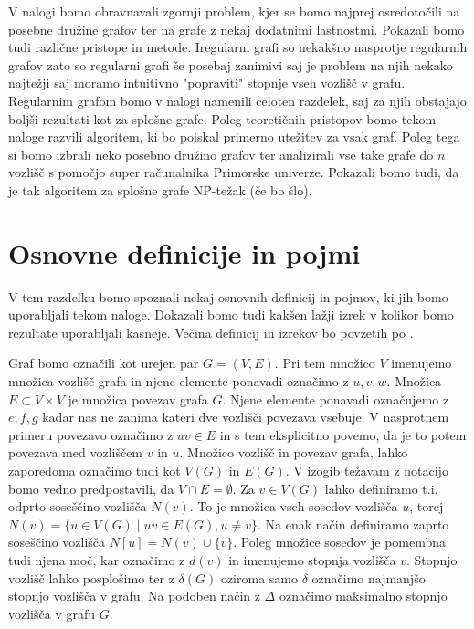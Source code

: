 \documentclass[12pt,a4paper,twoside]{article}
\theoremstyle{definition} %
\theoremstyle{plain} %
\numberwithin{equation}{section}  %
\begin{document}
V nalogi bomo obravnavali zgornji problem, kjer se bomo najprej osredotočili na posebne družine grafov ter na grafe z nekaj dodatnimi lastnostmi. Pokazali bomo tudi različne pristope in metode. Iregularni grafi so nekakšno nasprotje regularnih grafov zato so regularni grafi še posebaj zanimivi saj je problem na njih nekako najtežji saj moramo intuitivno "popraviti" stopnje vseh vozlišč v grafu. Regularnim grafom bomo v nalogi namenili celoten razdelek, saj za njih obstajajo boljši rezultati kot za splošne grafe. Poleg teoretičnih pristopov bomo tekom naloge razvili algoritem, ki bo poiskal primerno utežitev za vsak graf. Poleg tega si bomo izbrali neko posebno družino grafov ter analizirali vse take grafe do $n$ vozlišč s pomočjo super računalnika Primorske univerze. Pokazali bomo tudi, da je tak algoritem za splošne grafe NP-težak (če bo šlo).



\section{Osnovne definicije in pojmi}

V tem razdelku bomo spoznali nekaj osnovnih definicij in pojmov, ki jih bomo uporabljali tekom naloge. Dokazali bomo tudi kakšen lažji izrek v kolikor bomo rezultate uporabljali kasneje. Večina definicij in izrekov bo povzetih po \cite{maingraph}.

Graf bomo označili kot urejen par $G=(V, E)$. Pri tem množico $V$ imenujemo množica vozlišč grafa in njene elemente ponavadi označimo z $u, v, w$. Množica $E \subset V \times V$ je množica povezav grafa $G$. Njene elemente ponavadi označujemo z $e, f, g$ kadar nas ne zanima kateri dve vozlišči povezava vsebuje. V nasprotnem primeru povezavo označimo z $uv \in E$ in s tem eksplicitno povemo, da je to potem povezava med vozliščem $v$ in $u$. Množico vozlišč in povezav grafa, lahko zaporedoma označimo tudi kot $V(G)$ in $E(G)$. V izogib težavam z notacijo bomo vedno predpostavili, da $V \cap E = \emptyset$. 
Za $v \in V(G)$ lahko definiramo t.i. odprto soseščino vozlišča $N(v)$. To je množica vseh sosedov vozlišča $u$, torej $N(v) = \{u \in V(G) \mid uv \in E(G), u \neq v \}$. Na enak način definiramo zaprto soseščino vozlišča $N\left[u\right] = N(v) \cup \{v\}$. Poleg množice sosedov je pomembna tudi njena moč, kar označimo z $d(v)$ in imenujemo stopnja vozlišča $v$. Stopnjo vozlišč lahko posplošimo ter  z $\delta(G)$ oziroma samo $\delta$ označimo najmanjšo stopnjo vozlišča v grafu. Na podoben način z $\Delta$ označimo maksimalno stopnjo vozlišča v grafu $G$. 
\end{document}
